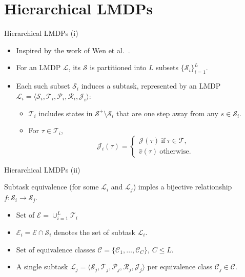 \documentclass{beamer}
\theoremstyle{mystyle}
\newcommand{\cC}{\mathcal{C}}
\newcommand{\cE}{\mathcal{E}}
\newcommand{\cJ}{\mathcal{J}}
\newcommand{\cL}{\mathcal{L}}
\newcommand{\cP}{\mathcal{P}}
\newcommand{\cR}{\mathcal{R}}
\newcommand{\cS}{\mathcal{S}}
\newcommand{\cT}{\mathcal{T}}
\begin{document}
\section{Hierarchical LMDPs}
\begin{frame}{Hierarchical LMDPs (i)}

    \begin{itemize}
        \item Inspired by the work of Wen et al.~\citep{conf/nips/Wen20}. 
        \item For an LMDP $\cL$, its {\color{blue} $\cS$ is partitioned} into $L$ subsets $\{\cS_i\}_{i=1}^L$. 
        \item Each such subset $\cS_i$ induces a subtask, represented by an LMDP $\cL_i=\langle\cS_i,\cT_i,\cP_i,\cR_i,\cJ_i\rangle$:
        \begin{itemize}
        \item $\cT_i$ includes states in $\cS^+\setminus\cS_i$ that are one step away from any $s \in \cS_i$.
        \item For $\tau\in\cT_i$,
        \[
            \cJ_i(\tau)=\begin{cases}
                            \cJ(\tau) \ \text{if} \ \tau\in\cT, \\
                            \hat{v}(\tau) \ \text{otherwise.}
                        \end{cases}
        \]
        \end{itemize}
\end{itemize}

\end{frame}

\begin{frame}{Hierarchical LMDPs (ii)}

\begin{definition}
Subtask equivalence (for some $\cL_i$ and $\cL_j$) imples a bijective relationship $f:\cS_i\rightarrow\cS_j$.
\end{definition}

\begin{itemize}
     
    \item Set of  {\color{blue}{\em exit states}} $\cE=\cup_{i=1}^L\cT_i$
    \item $\cE_i=\cE\cap\cS_i$ denotes the set of {\color{blue}{\em exit states inside}} subtask $\cL_i$. 
    \item Set of {\color{blue} equivalence classes} $\cC=\{\cC_1,\ldots,\cC_C\}$, $C\leq L$.
    \item {\color{blue} A single subtask} $\cL_j=\langle\cS_j,\cT_j,\cP_j,\cR_j,\cJ_j\rangle$ {\color{blue} per equivalence class} $\cC_j\in\cC$. 
    
\end{itemize}

    
\end{frame}
\end{document}
